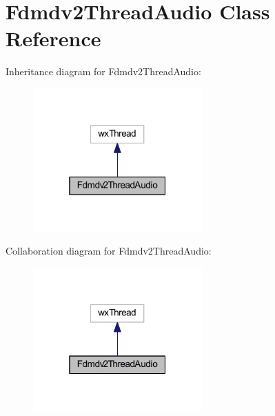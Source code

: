 \hypertarget{class_fdmdv2_thread_audio}{\section{Fdmdv2\-Thread\-Audio Class Reference}
\label{class_fdmdv2_thread_audio}
}


Inheritance diagram for Fdmdv2\-Thread\-Audio\-:
\nopagebreak
\begin{figure}[H]
\begin{center}
\leavevmode
\includegraphics[width=184pt]{class_fdmdv2_thread_audio__inherit__graph}
\end{center}
\end{figure}


Collaboration diagram for Fdmdv2\-Thread\-Audio\-:
\nopagebreak
\begin{figure}[H]
\begin{center}
\leavevmode
\includegraphics[width=184pt]{class_fdmdv2_thread_audio__coll__graph}
\end{center}
\end{figure}

